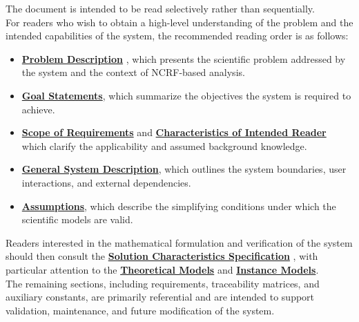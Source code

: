 \documentclass[12pt]{article}
\begin{document}
The document is intended to be read selectively rather than sequentially. \\

For readers who wish to obtain a high-level understanding of the problem and the
intended capabilities of the system, the recommended reading order is as follows:

\begin{itemize}

  \item \textbf{\hyperref[Sec-pd]{Problem Description}} , which presents the scientific
  problem addressed by the system and the context of NCRF-based analysis.
  \item \textbf{\hyperref[sec-goalstatements]{Goal Statements}}, which summarize the objectives
  the system is required to achieve.
  \item \textbf{\hyperref[sec-scope]{Scope of Requirements}} and
  \textbf{\hyperref[sec-IntendedReader]{Characteristics of Intended Reader}} which clarify the
  applicability and assumed background knowledge.
  \item \textbf{\hyperref[sec-gensysdesc]{General System Description}}, which outlines the system
  boundaries, user interactions, and external dependencies.
  \item \textbf{\hyperref[sec-assumpt]{Assumptions}}, which describe the simplifying
  conditions under which the scientific models are valid.
\end{itemize}

Readers interested in the mathematical formulation and verification of the system
should then consult the \textbf{\hyperref[sub-sec-scs]{Solution Characteristics Specification}}
, with particular attention to the \textbf{\hyperref[sec-theoretical]{Theoretical Models}}
and \textbf{\hyperref[sec-instance]{Instance Models}}. \\

The remaining sections, including requirements, traceability matrices, and auxiliary
constants, are primarily referential and are intended to support validation,
maintenance, and future modification of the system.

\newpage

\end{document}

